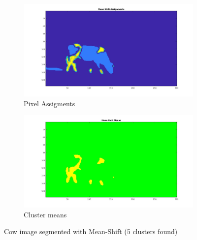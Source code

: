 \documentclass[paper=a4, fontsize=11pt]{scrartcl} %
\numberwithin{equation}{section} %
\numberwithin{figure}{section} %
\numberwithin{table}{section} %
\begin{document}
\begin{figure}
\centering
\begin{subfigure}{.5\textwidth}
  \centering
  \includegraphics[width=\linewidth]{cow/ms_ass.jpg}
  \caption{Pixel Assigments}
\end{subfigure}%
\begin{subfigure}{.5\textwidth}
  \centering
  \includegraphics[width=\linewidth]{cow/ms_means.jpg}
  \caption{Cluster means}
\end{subfigure}
\caption{Cow image segmented with Mean-Shift (5 clusters found)}
\label{fig:ms_cow}
\end{figure}
\end{document}
